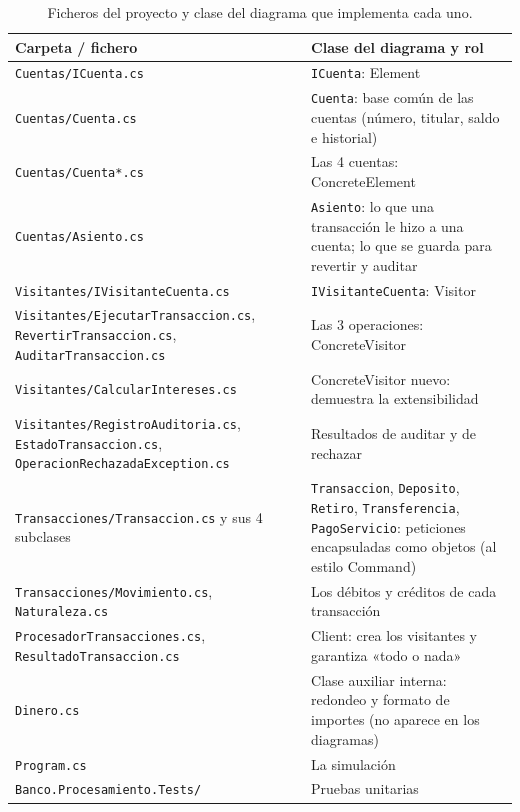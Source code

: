 \begin{table}[H]
\centering
\small
\begin{tabularx}{\textwidth}{>{\raggedright\arraybackslash}p{6.4cm}
                             >{\raggedright\arraybackslash}X}
\toprule
\textbf{Carpeta / fichero} & \textbf{Clase del diagrama y rol} \\
\midrule
\texttt{Cuentas/ICuenta.cs} & \texttt{ICuenta}: Element \\
\texttt{Cuentas/Cuenta.cs} & \texttt{Cuenta}: base común de las cuentas (número, titular,
                             saldo e historial) \\
\texttt{Cuentas/Cuenta*.cs} & Las 4 cuentas: ConcreteElement \\
\texttt{Cuentas/Asiento.cs} & \texttt{Asiento}: lo que una transacción le hizo a una cuenta;
                              lo que se guarda para revertir y auditar \\
\addlinespace
\texttt{Visitantes/IVisitanteCuenta.cs} & \texttt{IVisitanteCuenta}: Visitor \\
\texttt{Visitantes/EjecutarTransaccion.cs}, \texttt{RevertirTransaccion.cs},
\texttt{AuditarTransaccion.cs} & Las 3 operaciones: ConcreteVisitor \\
\texttt{Visitantes/CalcularIntereses.cs} & ConcreteVisitor nuevo: demuestra la
                                           extensibilidad \\
\texttt{Visitantes/RegistroAuditoria.cs}, \texttt{EstadoTransaccion.cs},
\texttt{OperacionRechazadaException.cs} & Resultados de auditar y de rechazar \\
\addlinespace
\texttt{Transacciones/Transaccion.cs} y sus 4 subclases & \texttt{Transaccion},
  \texttt{Deposito}, \texttt{Retiro}, \texttt{Transferencia}, \texttt{PagoServicio}:
  peticiones encapsuladas como objetos (al estilo Command) \\
\texttt{Transacciones/Movimiento.cs}, \texttt{Naturaleza.cs} & Los débitos y créditos de
                                                                 cada transacción \\
\addlinespace
\texttt{ProcesadorTransacciones.cs}, \texttt{ResultadoTransaccion.cs} & Client: crea los
  visitantes y garantiza «todo o nada» \\
\texttt{Dinero.cs} & Clase auxiliar interna: redondeo y formato de importes (no aparece en
                     los diagramas) \\
\texttt{Program.cs} & La simulación \\
\texttt{Banco.Procesamiento.Tests/} & Pruebas unitarias \\
\bottomrule
\end{tabularx}
\caption{Ficheros del proyecto y clase del diagrama que implementa cada uno.}
\end{table}

